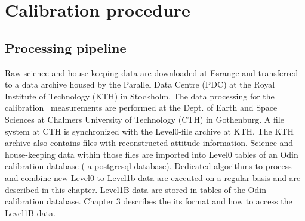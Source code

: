        
 
 
\chapter{Calibration procedure}
\label{chapter:calibration}




\section{Processing pipeline}

Raw science and house-keeping data are downloaded at
Esrange and transferred to a data archive housed by the Parallel
Data Centre (PDC) at the Royal Institute of Technology (KTH)
in Stockholm. The data processing for the calibration \smr\
measurements are performed at the Dept. of Earth and Space
Sciences at Chalmers University of Technology (CTH) in Gothenburg.
A file system at CTH is synchronized with the Level0-file archive 
at KTH. The KTH archive also contains files with reconstructed attitude
information.  Science and house-keeping data within those files
are imported into Level0 tables of an Odin calibration database
( a postgresql database). 
Dedicated algorithms to process and combine new Level0 to Level1b
data are executed on a regular basis and are described in this
chapter. Level1B data are stored in tables of the Odin calibration database.  
Chapter 3 describes the its format and how to access the Level1B data.



